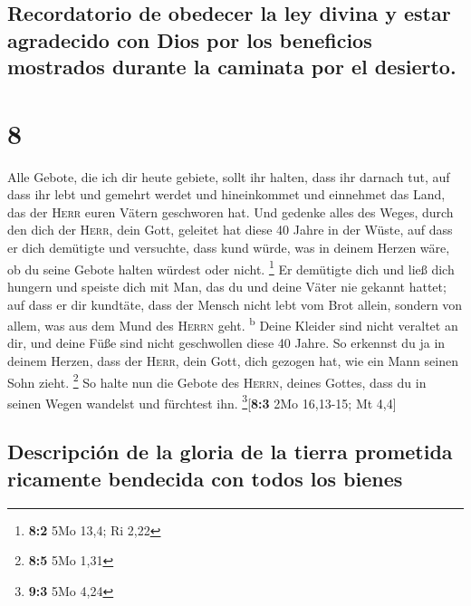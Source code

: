 \hypertarget{recordatorio-de-obedecer-la-ley-divina-y-estar-agradecido-con-dios-por-los-beneficios-mostrados-durante-la-caminata-por-el-desierto.}{%
\subsection{Recordatorio de obedecer la ley divina y estar agradecido
con Dios por los beneficios mostrados durante la caminata por el
desierto.}\label{recordatorio-de-obedecer-la-ley-divina-y-estar-agradecido-con-dios-por-los-beneficios-mostrados-durante-la-caminata-por-el-desierto.}}

\hypertarget{section-7}{%
\section{8}\label{section-7}}

 Alle Gebote, die ich dir heute gebiete, sollt ihr halten,
dass ihr darnach tut, auf dass ihr lebt und gemehrt werdet und
hineinkommet und einnehmet das Land, das der \textsc{Herr} euren Vätern
geschworen hat.  Und gedenke alles des Weges, durch den
dich der \textsc{Herr}, dein Gott, geleitet hat diese 40 Jahre in der
Wüste, auf dass er dich demütigte und versuchte, dass kund würde, was in
deinem Herzen wäre, ob du seine Gebote halten würdest oder nicht.
\footnote{\textbf{8:2} 5Mo 13,4; Ri 2,22}  Er demütigte
dich und ließ dich hungern und speiste dich mit Man, das du und deine
Väter nie gekannt hattet; auf dass er dir kundtäte, dass der Mensch
nicht lebt vom Brot allein, sondern von allem, was aus dem Mund des
\textsc{Herrn} geht. \textsuperscript{b}  Deine Kleider
sind nicht veraltet an dir, und deine Füße sind nicht geschwollen diese
40 Jahre.  So erkennst du ja in deinem Herzen, dass der
\textsc{Herr}, dein Gott, dich gezogen hat, wie ein Mann seinen Sohn
zieht. \footnote{\textbf{8:5} 5Mo 1,31}  So halte nun die
Gebote des \textsc{Herrn}, deines Gottes, dass du in seinen Wegen
wandelst und fürchtest ihn. \footnote{\textbf{9:3} 5Mo 4,24}{[}\textbf{8:3}
2Mo 16,13-15; Mt 4,4{]}

\hypertarget{descripciuxf3n-de-la-gloria-de-la-tierra-prometida-ricamente-bendecida-con-todos-los-bienes}{%
\subsection{Descripción de la gloria de la tierra prometida ricamente
bendecida con todos los
bienes}\label{descripciuxf3n-de-la-gloria-de-la-tierra-prometida-ricamente-bendecida-con-todos-los-bienes}}

